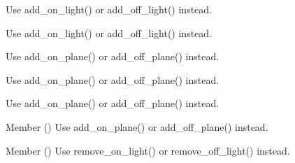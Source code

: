 \begin{DoxyRefList}
\label{deprecated__deprecated000045}%
%
Use add\+\_\+on\+\_\+light() or add\+\_\+off\+\_\+light() instead. 

\label{deprecated__deprecated000050}%
%
Use add\+\_\+on\+\_\+light() or add\+\_\+off\+\_\+light() instead. 

\label{deprecated__deprecated000033}%
%
Use add\+\_\+on\+\_\+plane() or add\+\_\+off\+\_\+plane() instead. 

\label{deprecated__deprecated000032}%
%
Use add\+\_\+on\+\_\+plane() or add\+\_\+off\+\_\+plane() instead. 

\label{deprecated__deprecated000031}%
%
Use add\+\_\+on\+\_\+plane() or add\+\_\+off\+\_\+plane() instead.  
\item[Member \doxylink{clipPlaneAttrib_8cxx_ae6830302663763450d2411575857f7fd}{CPT} (\doxylink{classRenderAttrib}{Render\+Attrib}) \doxylink{classClipPlaneAttrib}{Clip\+Plane\+Attrib}]\label{deprecated__deprecated000030}%
%
Use add\+\_\+on\+\_\+plane() or add\+\_\+off\+\_\+plane() instead.  
\item[Member \doxylink{eggRenderState_8cxx_a57916730bda635a525d4483d5445618f}{CPT} (\doxylink{classRenderAttrib}{Render\+Attrib}) \doxylink{classEggRenderState}{Egg\+Render\+State}]\label{deprecated__deprecated000051}%
%
Use remove\+\_\+on\+\_\+light() or remove\+\_\+off\+\_\+light() instead. 


\end{DoxyRefList}
